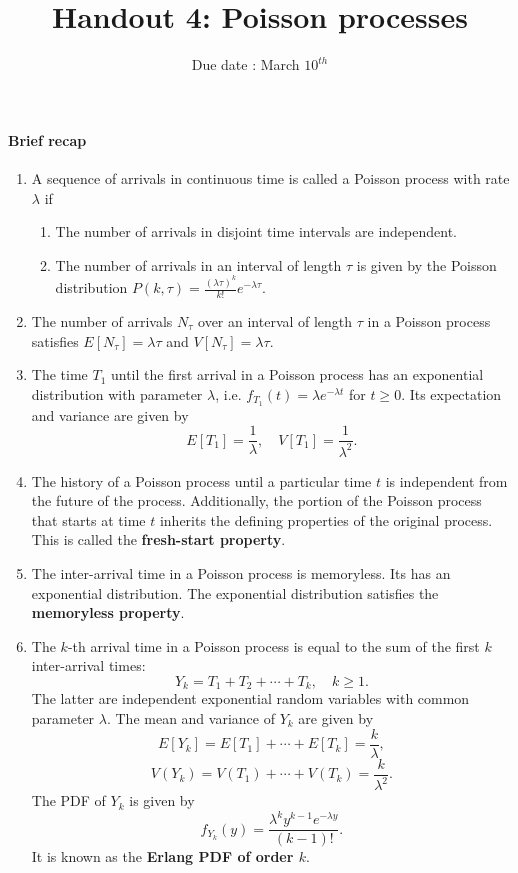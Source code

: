 \documentclass[twocolumn,12pt,a4paper]{article}
\title{ \bfseries \Huge {Handout 4:  Poisson processes }}
\date{Due date : March $10^{th}$}
\newcounter{num}  %
\begin{document}
	\maketitle
	\setcounter{num}{1}  %
	
	\thispagestyle{empty} 
	\paragraph{Brief recap}
	\begin{enumerate}
		\item A sequence of arrivals in continuous time is called a Poisson process with rate $\lambda$ if
	\begin{enumerate}
		\item The number of arrivals in disjoint time intervals are independent.
		\item The number of arrivals in an interval of length $\tau$ is given by the Poisson distribution 
		$
		P(k,\tau) = \frac{(\lambda\tau)^k}{k!}e^{-\lambda\tau}.
		$
	\end{enumerate}	
	\item The number of arrivals $N_\tau$ over an interval of length $\tau$ in a Poisson process satisfies $E[N_\tau] = \lambda\tau$ and $ V[N_\tau] = \lambda\tau$.
	
	\item The time \( T_1 \) until the first arrival in a Poisson process has an exponential distribution with parameter \( \lambda \), i.e. $f_{T_1}(t) = \lambda e^{-\lambda t}$ for  $t \geq 0$. Its expectation and variance are given by
	\[
	 E[T_1] = \frac{1}{\lambda}, \quad V[T_1] = \frac{1}{\lambda^2}.
	\]
	
	\item The history of a Poisson process until a particular time $t$ is independent
	from the future of the process.
	Additionally, the portion of the Poisson process that starts at time $t$ inherits the
	defining properties of the original process.
	This is called the \textbf{fresh-start property}.
	
	\item The inter-arrival time in a Poisson process is memoryless. 
	Its has an exponential distribution. 
	The exponential distribution satisfies the \textbf{memoryless property}.
	
	\item The \( k \)-th arrival time in a Poisson process is equal to the sum of the first \( k \) inter-arrival times:
	\[
	Y_k = T_1 + T_2 + \cdots + T_k,\quad k\geq 1.
	\]
	The latter are independent exponential random variables with common parameter \( \lambda \). The mean and variance of \( Y_k \) are given by
	\[
	E[Y_k] = E[T_1] + \cdots + E[T_k] = \frac{k}{\lambda},
	\]
	\[
	V(Y_k) = V(T_1) + \cdots + V(T_k) = \frac{k}{\lambda^2}.
	\]
	The PDF of \( Y_k \) is given by
	\[
	f_{Y_k}(y) = \frac{\lambda^k y^{k-1} e^{-\lambda y}}{(k-1)!}.
	\]
	It is known as the \textbf{Erlang PDF of order \( k \)}.
	

\end{enumerate}
\end{document}
